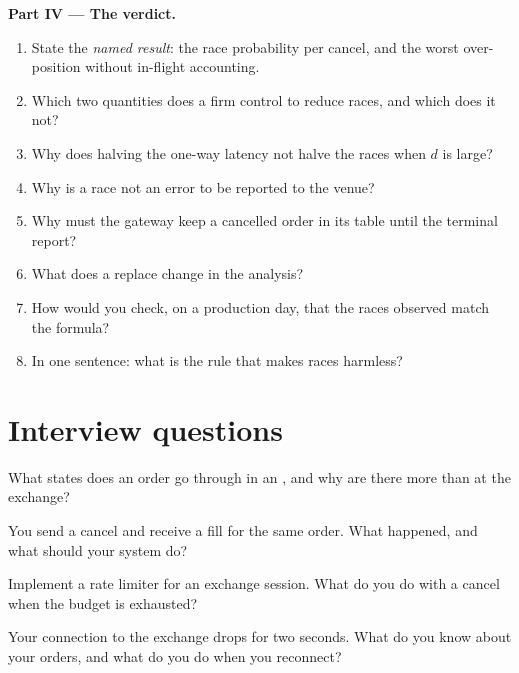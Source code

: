 \begin{problem}
\medskip\noindent\textbf{Part IV --- The verdict.}
\begin{enumerate}[resume]
\item State the \emph{named result}: the race probability per cancel, and the worst over-position without in-flight
accounting.
\item Which two quantities does a firm control to reduce races, and which does it not?
\item Why does halving the one-way latency not halve the races when $d$ is large?
\item Why is a race not an error to be reported to the venue?
\item Why must the gateway keep a cancelled order in its table until the terminal report?
\item What does a replace change in the analysis?
\item How would you check, on a production day, that the races observed match the formula?
\item In one sentence: what is the rule that makes races harmless?
\end{enumerate}
\end{problem}

\section{Interview questions}

\begin{interviewq}\label{iq:ll:order-gateway-and-order-management:1}
What states does an order go through in an , and why are there more than at the exchange?
\end{interviewq}

\begin{interviewq}\label{iq:ll:order-gateway-and-order-management:2}
You send a cancel and receive a fill for the same order. What happened, and what should your system do?
\end{interviewq}

\begin{interviewq}\label{iq:ll:order-gateway-and-order-management:3}
Implement a rate limiter for an exchange session. What do you do with a cancel when the budget is exhausted?
\end{interviewq}

\begin{interviewq}\label{iq:ll:order-gateway-and-order-management:4}
Your connection to the exchange drops for two seconds. What do you know about your orders, and what do you do when you
reconnect?
\end{interviewq}

